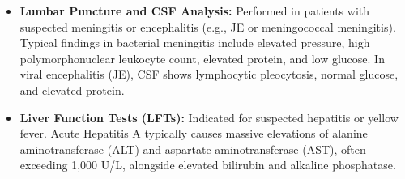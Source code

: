 \begin{itemize}
    \item \textbf{Lumbar Puncture and CSF Analysis:} Performed in patients with suspected meningitis or encephalitis (e.g., JE or meningococcal meningitis). Typical findings in bacterial meningitis include elevated pressure, high polymorphonuclear leukocyte count, elevated protein, and low glucose. In viral encephalitis (JE), CSF shows lymphocytic pleocytosis, normal glucose, and elevated protein.
    \item \textbf{Liver Function Tests (LFTs):} Indicated for suspected hepatitis or yellow fever. Acute Hepatitis A typically causes massive elevations of alanine aminotransferase (ALT) and aspartate aminotransferase (AST), often exceeding 1,000 U/L, alongside elevated bilirubin and alkaline phosphatase.
\end{itemize}

